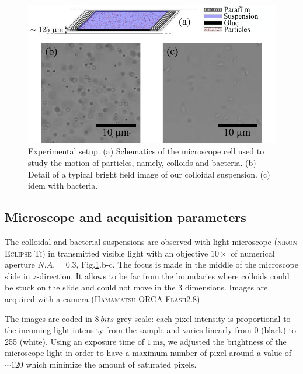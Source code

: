\documentclass[%
 aip,
 jmp,%
 amsmath,amssymb,
reprint,%
]{revtex4-1}
\begin{document}
\begin{figure}
\includegraphics[width=\linewidth]{Lamelle_Photos.pdf}
\caption{Experimental setup. (a) Schematics of the microscope cell used to study the motion of particles, namely, colloids and bacteria. (b) Detail of a typical bright field image of our colloidal suspension. (c) idem with bacteria.}
\label{Slide}
\end{figure}

\subsection{Microscope and acquisition parameters}

The colloidal and bacterial suspensions are observed with light microscope (\textsc{nikon Eclipse Ti}) in transmitted visible light with an objective $10 \times$ of numerical aperture $N.A. = 0.3$, Fig.\ref{Slide}.b-c. The focus is made in the middle of the microscope slide in $z$-direction. It allows to be far from the boundaries where colloids could be stuck on the slide and could not move in the 3 dimensions. Images are acquired with a camera (\textsc{Hamamatsu ORCA-Flash2.8}).

The images are coded in $\SI{8}{bits}$  grey-scale: each pixel intensity is proportional to the incoming light intensity from the sample and varies linearly from  0 (black) to 255 (white). Using an exposure time of $\SI{1}{\milli\second}$, we adjusted the brightness of the microscope light in order to have a maximum number of pixel around a value of $\sim 120$ which minimize the amount of saturated pixels.
\end{document}
